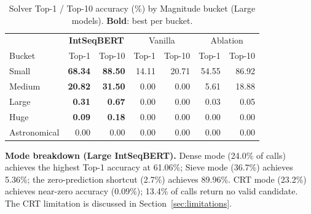 \begin{table}[t]
\caption{Solver Top-1 / Top-10 accuracy (\%) by Magnitude bucket (Large models).
         \textbf{Bold}: best per bucket.}
\label{tab:solver-bucket}
\centering
\begin{tabular}{l rr rr rr}
\hline
 & \multicolumn{2}{c}{\textbf{IntSeqBERT}} & \multicolumn{2}{c}{Vanilla} & \multicolumn{2}{c}{Ablation} \\
Bucket & Top-1 & Top-10 & Top-1 & Top-10 & Top-1 & Top-10 \\
\hline
Small        & \textbf{68.34} & \textbf{88.50} & 14.11 & 20.71 & 54.55 & 86.92 \\
Medium       & \textbf{20.82} & \textbf{31.50} &  0.00 &  0.00 &  5.61 & 18.88 \\
Large        & \textbf{ 0.31} & \textbf{ 0.67} &  0.00 &  0.00 &  0.03 &  0.05 \\
Huge         & \textbf{ 0.09} & \textbf{ 0.18} &  0.00 &  0.00 &  0.00 &  0.00 \\
Astronomical &  0.00          &  0.00          &  0.00 &  0.00 &  0.00 &  0.00 \\
\hline
\end{tabular}
\end{table}

\textbf{Mode breakdown (Large IntSeqBERT).} Dense mode (24.0\% of calls) achieves the highest
Top-1 accuracy at 61.06\%; Sieve mode (36.7\%) achieves 5.36\%; the zero-prediction shortcut
(2.7\%) achieves 89.96\%. CRT mode (23.2\%) achieves near-zero accuracy (0.09\%); 13.4\% of
calls return no valid candidate. The CRT limitation is discussed in Section~\ref{sec:limitations}.
